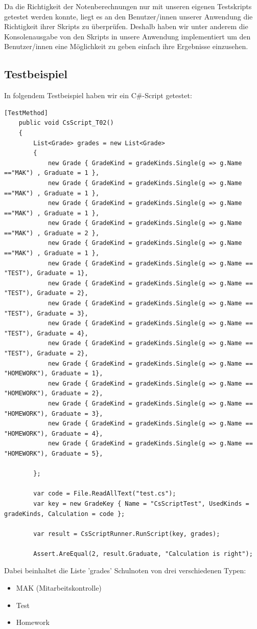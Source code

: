 Da die Richtigkeit der Notenberechnungen nur mit unseren eigenen Testskripts getestet werden konnte,
liegt es an den Benutzer/innen unserer Anwendung die Richtigkeit ihrer Skripts zu überprüfen. Deshalb 
haben wir unter anderem die Konsolenausgabe von den Skripts in unsere Anwendung implementiert um den
Benutzer/innen eine Möglichkeit zu geben einfach ihre Ergebnisse einzusehen.

\newpage
\subsection*{Testbeispiel}

In folgendem Testbeispiel haben wir ein C\#-Script getestet:

\begin{lstlisting}[language={[Sharp]C},caption=Test for C\#-Scripting,label=lst:impl:csc]
[TestMethod]
    public void CsScript_T02()
    {
        List<Grade> grades = new List<Grade>
        {
            new Grade { GradeKind = gradeKinds.Single(g => g.Name =="MAK") , Graduate = 1 },
            new Grade { GradeKind = gradeKinds.Single(g => g.Name =="MAK") , Graduate = 1 },
            new Grade { GradeKind = gradeKinds.Single(g => g.Name =="MAK") , Graduate = 1 },
            new Grade { GradeKind = gradeKinds.Single(g => g.Name =="MAK") , Graduate = 2 },
            new Grade { GradeKind = gradeKinds.Single(g => g.Name =="MAK") , Graduate = 1 },
            new Grade { GradeKind = gradeKinds.Single(g => g.Name == "TEST"), Graduate = 1},
            new Grade { GradeKind = gradeKinds.Single(g => g.Name == "TEST"), Graduate = 2},
            new Grade { GradeKind = gradeKinds.Single(g => g.Name == "TEST"), Graduate = 3},
            new Grade { GradeKind = gradeKinds.Single(g => g.Name == "TEST"), Graduate = 4},
            new Grade { GradeKind = gradeKinds.Single(g => g.Name == "TEST"), Graduate = 2},
            new Grade { GradeKind = gradeKinds.Single(g => g.Name == "HOMEWORK"), Graduate = 1},
            new Grade { GradeKind = gradeKinds.Single(g => g.Name == "HOMEWORK"), Graduate = 2},
            new Grade { GradeKind = gradeKinds.Single(g => g.Name == "HOMEWORK"), Graduate = 3},
            new Grade { GradeKind = gradeKinds.Single(g => g.Name == "HOMEWORK"), Graduate = 4},
            new Grade { GradeKind = gradeKinds.Single(g => g.Name == "HOMEWORK"), Graduate = 5},

        };

        var code = File.ReadAllText("test.cs");
        var key = new GradeKey { Name = "CsScriptTest", UsedKinds = gradeKinds, Calculation = code };

        var result = CsScriptRunner.RunScript(key, grades);

        Assert.AreEqual(2, result.Graduate, "Calculation is right");
\end{lstlisting}

Dabei beinhaltet die Liste 'grades' Schulnoten von drei verschiedenen Typen:
\begin{itemize}
    \item MAK (Mitarbeitskontrolle)
    \item Test
    \item Homework
\end{itemize}
